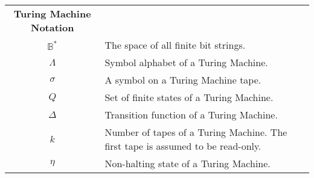 \documentclass[11pt]{article}
\newcommand{\B}{\mathbb{B}}
\begin{document}
\begin{tabular}{cp{}}
\textbf{Turing Machine Notation} \\

$ \B^{*} $ & The space of all finite bit strings. \\
$ \Lambda $ & Symbol alphabet of a Turing Machine. \\
$ \sigma  $ & A symbol on a Turing Machine tape. \\
$ Q $ & Set of finite states of a Turing Machine. \\
$ \Delta $ & Transition function of a Turing Machine. \\
$ k $ & Number of tapes of a Turing Machine. The first tape is assumed to be read-only. \\
$ \eta $ & Non-halting state of a Turing Machine. \\


\end{tabular}
\end{document}
